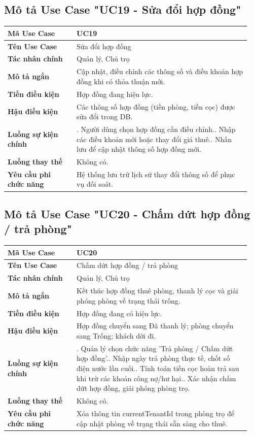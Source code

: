 \documentclass[a4paper,oneside]{report}
\begin{document}
\subsection{Mô tả Use Case "UC19 - Sửa đổi hợp đồng"}

\begin{longtable}[]{@{}>{\RaggedRight\arraybackslash}p{0.27\linewidth}>{\RaggedRight\arraybackslash}p{0.68\linewidth}@{}}
\toprule
\textbf{Mã Use Case} & UC19\tabularnewline
\midrule
\endhead
\textbf{Tên Use Case} & Sửa đổi hợp đồng\tabularnewline
\textbf{Tác nhân chính} & Quản lý, Chủ trọ\tabularnewline
\textbf{Mô tả ngắn} & Cập nhật, điều chỉnh các thông số và điều khoản
hợp đồng khi có thỏa thuận mới.\tabularnewline
\textbf{Tiền điều kiện} & Hợp đồng đang hiệu lực.\tabularnewline
\textbf{Hậu điều kiện} & Các thông số hợp đồng (tiền phòng, tiền cọc)
được sửa đổi trong DB.\tabularnewline
\textbf{Luồng sự kiện chính} & 1. Người dùng chọn hợp
đồng cần điều chỉnh.\newline 2. Nhập các điều khoản mới hoặc thay
đổi giá thuê.\newline 3. Nhấn lưu để cập nhật thông số hợp đồng
mới.\tabularnewline
\textbf{Luồng thay thế} & Không có.\tabularnewline
\textbf{Yêu cầu phi chức năng} & Hệ thống lưu trữ lịch sử thay đổi thông
số để phục vụ đối soát.\tabularnewline
\bottomrule
\end{longtable}

\subsection{Mô tả Use Case "UC20 - Chấm dứt hợp đồng / trả phòng"}

\begin{longtable}[]{@{}>{\RaggedRight\arraybackslash}p{0.27\linewidth}>{\RaggedRight\arraybackslash}p{0.68\linewidth}@{}}
\toprule
\textbf{Mã Use Case} & UC20\tabularnewline
\midrule
\endhead
\textbf{Tên Use Case} & Chấm dứt hợp đồng / trả phòng\tabularnewline
\textbf{Tác nhân chính} & Quản lý, Chủ trọ\tabularnewline
\textbf{Mô tả ngắn} & Kết thúc hợp đồng thuê phòng, thanh lý cọc và giải
phóng phòng về trạng thái trống.\tabularnewline
\textbf{Tiền điều kiện} & Hợp đồng đang có hiệu lực.\tabularnewline
\textbf{Hậu điều kiện} & Hợp đồng chuyển sang Đã thanh lý; phòng chuyển
sang Trống; khách dời đi.\tabularnewline
\textbf{Luồng sự kiện chính} & 1. Quản lý chọn chức
năng 'Trả phòng / Chấm dứt hợp đồng'.\newline 2. Nhập ngày trả
phòng thực tế, chốt số điện nước lần cuối.\newline 3. Tính toán
tiền cọc hoàn trả sau khi trừ các khoản công nợ/hư hại.\newline 4.
Xác nhận chấm dứt hợp đồng, giải phóng phòng trọ.\tabularnewline
\textbf{Luồng thay thế} & Không có.\tabularnewline
\textbf{Yêu cầu phi chức năng} & Xóa thông tin currentTenantId trong
phòng trọ để cập nhật phòng về trạng thái sẵn sàng cho
thuê.\tabularnewline
\bottomrule
\end{longtable}
\end{document}
